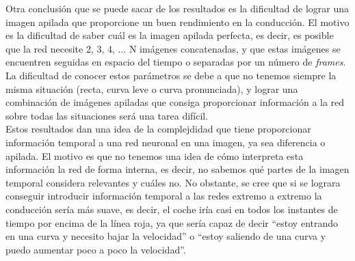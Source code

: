 Otra conclusión que se puede sacar de los resultados es la dificultad de lograr una imagen apilada que proporcione un buen rendimiento en la conducción. El motivo es la dificultad de saber cuál es la imagen apilada perfecta, es decir, es posible que la red necesite 2, 3, 4, ... N imágenes concatenadas, y que estas imágenes se encuentren seguidas en espacio del tiempo o separadas por un número de \textit{frames}. La dificultad de conocer estos parámetros se debe a que no tenemos siempre la misma situación (recta, curva leve o curva pronunciada), y lograr una combinación de imágenes apiladas que consiga proporcionar información a la red sobre todas las situaciones será una tarea difícil.\\

Estos resultados dan una idea de la complejdidad que tiene proporcionar información temporal a una red neuronal en una imagen, ya sea diferencia o apilada. El motivo es que no tenemos una idea de cómo interpreta esta información la red de forma interna, es decir, no sabemos qué partes de la imagen temporal considera relevantes y cuáles no. No obstante, se cree que si se lograra conseguir introducir información temporal a las redes extremo a extremo la conducción sería más suave, es decir, el coche iría casi en todos los instantes de tiempo por encima de la línea roja, ya que sería capaz de decir ``estoy entrando en una curva y necesito bajar la velocidad'' o ``estoy saliendo de una curva y puedo aumentar poco a poco la velocidad''.\\